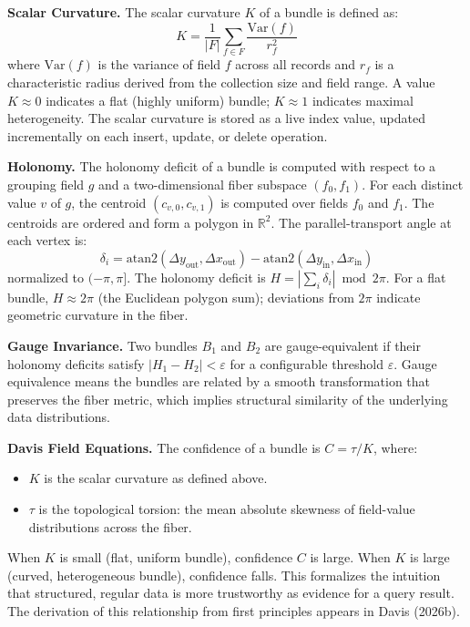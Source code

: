 \documentclass[11pt,letterpaper]{article}
\begin{document}
\textbf{Scalar Curvature.} The scalar curvature $K$ of a bundle is defined as:
\[
K = \frac{1}{|F|} \sum_{f \in F} \frac{\mathrm{Var}(f)}{r_f^2}
\]
where $\mathrm{Var}(f)$ is the variance of field $f$ across all records and $r_f$ is a characteristic radius derived from the collection size and field range. A value $K \approx 0$ indicates a flat (highly uniform) bundle; $K \approx 1$ indicates maximal heterogeneity. The scalar curvature is stored as a live index value, updated incrementally on each insert, update, or delete operation.

\textbf{Holonomy.} The holonomy deficit of a bundle is computed with respect to a grouping field $g$ and a two-dimensional fiber subspace $(f_0, f_1)$. For each distinct value $v$ of $g$, the centroid $(c_{v,0}, c_{v,1})$ is computed over fields $f_0$ and $f_1$. The centroids are ordered and form a polygon in $\mathbb{R}^2$. The parallel-transport angle at each vertex is:
\[
\delta_i = \mathrm{atan2}(\Delta y_{\mathrm{out}}, \Delta x_{\mathrm{out}}) - \mathrm{atan2}(\Delta y_{\mathrm{in}}, \Delta x_{\mathrm{in}})
\]
normalized to $(-\pi, \pi]$. The holonomy deficit is $H = \left|\sum_i \delta_i\right| \bmod 2\pi$. For a flat bundle, $H \approx 2\pi$ (the Euclidean polygon sum); deviations from $2\pi$ indicate geometric curvature in the fiber.

\textbf{Gauge Invariance.} Two bundles $B_1$ and $B_2$ are gauge-equivalent if their holonomy deficits satisfy $|H_1 - H_2| < \varepsilon$ for a configurable threshold $\varepsilon$. Gauge equivalence means the bundles are related by a smooth transformation that preserves the fiber metric, which implies structural similarity of the underlying data distributions.

\textbf{Davis Field Equations.} The confidence of a bundle is $C = \tau / K$, where:
\begin{itemize}[nosep]
  \item $K$ is the scalar curvature as defined above.
  \item $\tau$ is the topological torsion: the mean absolute skewness of field-value distributions across the fiber.
\end{itemize}
When $K$ is small (flat, uniform bundle), confidence $C$ is large. When $K$ is large (curved, heterogeneous bundle), confidence falls. This formalizes the intuition that structured, regular data is more trustworthy as evidence for a query result. The derivation of this relationship from first principles appears in Davis (2026b).
\end{document}
